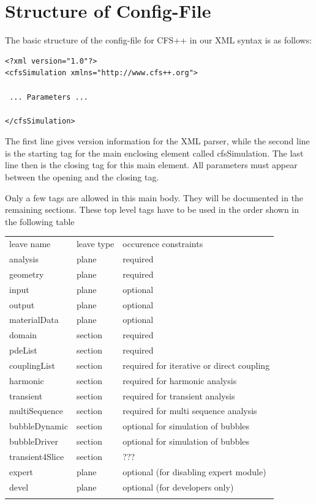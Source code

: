 \chapter{Structure of Config-File}
\label{sec:general}
%
%
The basic structure of the config-file for CFS++ in our XML
syntax is as follows:

\begin{verbatim}
<?xml version="1.0"?>
<cfsSimulation xmlns="http://www.cfs++.org">

 ... Parameters ...

</cfsSimulation>
\end{verbatim}

The first line gives version information for the XML parser, while the
second line is the starting tag for the main enclosing element called
cfsSimulation.  The last line then is the closing tag for this main
element. All parameters must appear between the opening and the
closing tag.

Only a few tags are allowed in this main body. They will be documented in the
remaining sections. These top level tags have to be used in the order shown in
the following table
\begin{center}
  \begin{longtable}{lll}
    \hline\noalign{\smallskip}
    leave name & leave type & occurence constraints \\
    \noalign{\smallskip}\hline\noalign{\smallskip}
    analysis        & plane   & required\\
    geometry        & plane   & required\\
    input           & plane   & optional\\
    output          & plane   & optional\\
    materialData    & plane   & optional\\
    domain          & section & required \\
    pdeList         & section & required \\
    couplingList    & section & required for iterative or direct coupling\\
    harmonic        & section & required for harmonic analysis \\
    transient       & section & required for transient analysis \\
    multiSequence   & section & required for multi sequence analysis \\
    bubbleDynamic   & section & optional for simulation of bubbles \\
    bubbleDriver    & section & optional for simulation of bubbles \\
    transient4Slice & section & ??? \\
    expert          & plane   & optional (for disabling expert module)\\
    devel           & plane   & optional (for developers only)\\
    \noalign{\smallskip}\hline
  \end{longtable}
\end{center}



